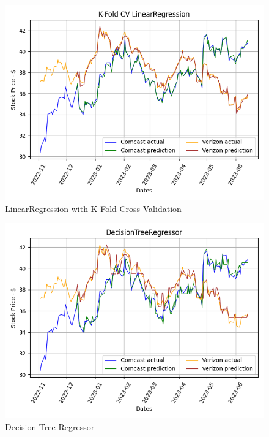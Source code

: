 \documentclass[conference]{IEEEtran}
\begin{document}
\begin{figure}
    \includegraphics[width=\columnwidth]{K-Fold CV LinearRegression}
    \caption{LinearRegression with K-Fold Cross Validation}
\end{figure}

\begin{figure}
    \includegraphics[width=\columnwidth]{DecisionTreeRegressor}
    \caption{Decision Tree Regressor}
\end{figure}
\end{document}
